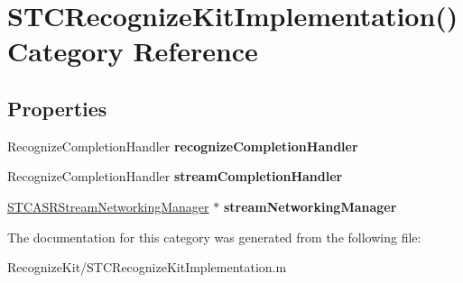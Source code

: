 \hypertarget{category_s_t_c_recognize_kit_implementation_07_08}{}\section{S\+T\+C\+Recognize\+Kit\+Implementation() Category Reference}
\label{category_s_t_c_recognize_kit_implementation_07_08}
\subsection*{Properties}
\begin{DoxyCompactItemize}
\item 
\hypertarget{category_s_t_c_recognize_kit_implementation_07_08_a245a22d2fd8b2acf46a063b388ef0b36}{}\label{category_s_t_c_recognize_kit_implementation_07_08_a245a22d2fd8b2acf46a063b388ef0b36} 
Recognize\+Completion\+Handler {\bfseries recognize\+Completion\+Handler}
\item 
\hypertarget{category_s_t_c_recognize_kit_implementation_07_08_a37c4388ee27148e356a8b97d3de7c3f8}{}\label{category_s_t_c_recognize_kit_implementation_07_08_a37c4388ee27148e356a8b97d3de7c3f8} 
Recognize\+Completion\+Handler {\bfseries stream\+Completion\+Handler}
\item 
\hypertarget{category_s_t_c_recognize_kit_implementation_07_08_a5cfd808dd4be69a9452afc558d5909d0}{}\label{category_s_t_c_recognize_kit_implementation_07_08_a5cfd808dd4be69a9452afc558d5909d0} 
\hyperlink{interface_s_t_c_a_s_r_stream_networking_manager}{S\+T\+C\+A\+S\+R\+Stream\+Networking\+Manager} $\ast$ {\bfseries stream\+Networking\+Manager}
\end{DoxyCompactItemize}


The documentation for this category was generated from the following file\+:\begin{DoxyCompactItemize}
\item 
Recognize\+Kit/S\+T\+C\+Recognize\+Kit\+Implementation.\+m\end{DoxyCompactItemize}
